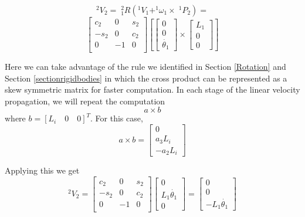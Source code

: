 \begin{ExampleCont}

\[
^2V_2 = \;^2_1R(^1V_1 + ^1\omega_1 \times \;^1P_2) =
\]
\[
\left [
\begin{array}{ccc}
c_2	& 0	& s_2	 	\\
-s_2	& 0	& c_2	 	\\
0	& -1	& 0	 	\\
\end{array}
\right ]
\left[
\left[
\begin{array}{c}
0  \\ 0 \\ \dot{\theta_1}
\end{array}
\right ]
\times
\left[
\begin{array}{c}
L_1  \\ 0 \\ 0
\end{array}
\right ]
\right ]
\]

Here we can take advantage of the rule we identified in Section \ref{Rotation} and Section \ref{sectionrigidbodies}
in which the cross product can be represented as a skew symmetric matrix for faster computation.  In each stage of the linear velocity propagation, we will repeat the computation
\[
a\times b
\]
where $b = [L_i \quad 0 \quad 0]^T$.   For this case,
\[
a \times b =
\left[
\begin{array}{c}
0  \\[6pt] a_3L_i \\[6pt] -a_2L_i
\end{array}
\right ]
\]

Applying this we get
\[
^2V_2 =
\left [
\begin{array}{ccc}
c_2	& 0	& s_2	 	\\
-s_2	& 0	& c_2	 	\\
0	& -1	& 0	 	\\
\end{array}
\right ]
\left[
\begin{array}{c}
0  \\ L_1 \dot{\theta_1} \\ 0
\end{array}
\right ]
=
\left[
\begin{array}{c}
0  \\ 0 \\ -L_1 \dot{\theta_1}
\end{array}
\right ]
\]


\end{ExampleCont}

